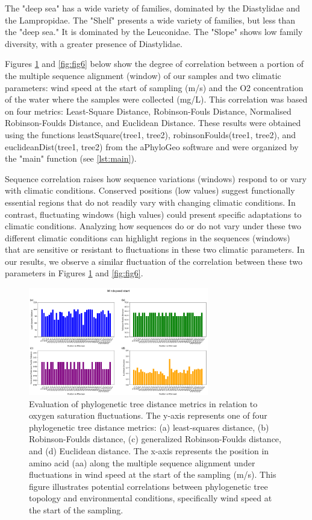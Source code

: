 The "deep sea" has a wide variety of families, dominated by the Diastylidae and the Lampropidae. The "Shelf" presents a wide variety of families, but less than the "deep sea." It is dominated by the Leuconidae. The "Slope" shows low family diversity, with a greater presence of Diastylidae. 

Figures \ref{fig:fig5} and \ref{fig:fig6} below show the degree of correlation between a portion of the multiple sequence alignment (window) of our samples and two climatic parameters: wind speed at the start of sampling (m/s) and the O2 concentration of the water where the samples were collected (mg/L). This correlation was based on four metrics: Least-Square Distance, Robinson-Fouls Distance, Normalised Robinson-Foulds Distance, and Euclidean Distance. These results were obtained using the functions leastSquare(tree1, tree2), robinsonFoulds(tree1, tree2), and euclideanDist(tree1, tree2) from the aPhyloGeo software and were organized by the "main" function (see \autoref{lst:main}). 

Sequence correlation raises how sequence variations (windows) respond to or vary with climatic conditions. Conserved positions (low values) suggest functionally essential regions that do not readily vary with changing climatic conditions. In contrast, fluctuating windows (high values) could present specific adaptations to climatic conditions. Analyzing how sequences do or do not vary under these two different climatic conditions can highlight regions in the sequences (windows) that are sensitive or resistant to fluctuations in these two climatic parameters. In our results, we observe a similar fluctuation of the correlation between these two parameters in Figures \ref{fig:fig5} and \ref{fig:fig6}.

\begin{figure}[]
    \centering
    \includegraphics[width=0.7\textwidth]{figure5.png}
    \caption{Evaluation of phylogenetic tree distance metrics in relation to oxygen saturation fluctuations. The y-axis represents one of four phylogenetic tree distance metrics: (a) least-squares distance, (b) Robinson-Foulds distance, (c) generalized Robinson-Foulds distance, and (d) Euclidean distance. The x-axis represents the position in amino acid (aa) along the multiple sequence alignment under fluctuations in wind speed at the start of the sampling (m/s). This figure illustrates potential correlations between phylogenetic tree topology and environmental conditions, specifically wind speed at the start of the sampling. \label{fig:fig5}}
\end{figure}

